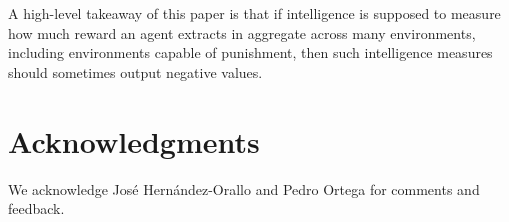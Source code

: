 \documentclass[runningheads]{llncs}
\begin{document}
A high-level takeaway of
this paper is that if intelligence is supposed to measure how much
reward an agent extracts in aggregate across many environments,
including environments capable of punishment, then such
intelligence measures should sometimes output negative
values.

\section*{Acknowledgments}

We acknowledge Jos{\'e} Hern{\'a}ndez-Orallo and Pedro Ortega for
comments and feedback.




\end{document}
